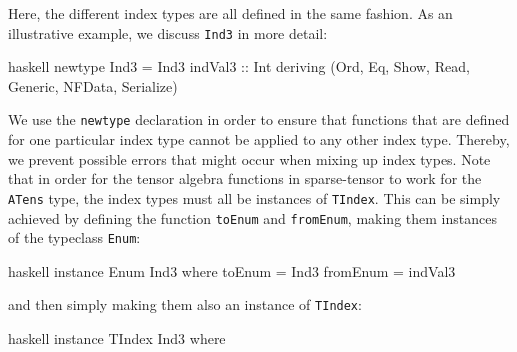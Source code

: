 Here, the different index types are all defined in the same fashion. As an illustrative example, we discuss \texttt{Ind3} in more detail:
\begin{center}
\begin{cminted}{haskell}
newtype Ind3 =  Ind3 {indVal3 :: Int}
    deriving (Ord, Eq, Show, Read, Generic, NFData, Serialize)
\end{cminted}
\end{center}
We use the \texttt{newtype} declaration in order to ensure that functions that are defined for one particular index type cannot be applied to any other index type. Thereby, we prevent possible errors that might occur when mixing up index types.
Note that in order for the tensor algebra functions in sparse-tensor to work for the \texttt{ATens} type, the index types must all be instances of \texttt{TIndex}. This can be simply achieved by defining the function \texttt{toEnum} and \texttt{fromEnum}, making them instances of the typeclass \texttt{Enum}: 
\begin{center}
\begin{cminted}{haskell}
instance Enum Ind3 where
    toEnum = Ind3
    fromEnum = indVal3
\end{cminted} 
\end{center}
and then simply making them also an instance of \texttt{TIndex}:

\begin{center}
\begin{cminted}{haskell}
instance TIndex Ind3 where
\end{cminted} 
\end{center}

